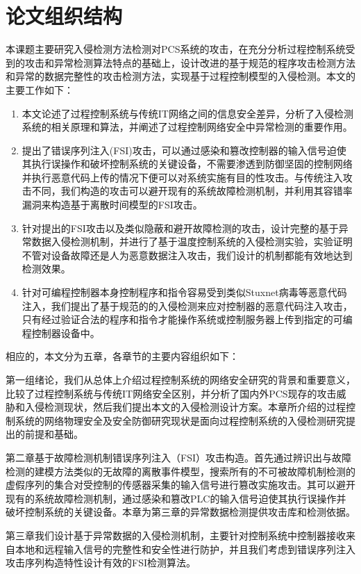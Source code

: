 \section{论文组织结构}

本课题主要研究入侵检测方法检测对PCS系统的攻击，在充分分析过程控制系统受到的攻击和异常检测算法特点的基础上，设计改进的基于规范的程序攻击检测方法和异常的数据完整性的攻击检测方法，实现基于过程控制模型的入侵检测。本文的主要工作如下：
\begin{enumerate}
	\item 本文论述了过程控制系统与传统IT网络之间的信息安全差异，分析了入侵检测系统的相关原理和算法，并阐述了过程控制网络安全中异常检测的重要作用。
	\item 提出了错误序列注入(FSI)攻击，可以通过感染和篡改控制器的输入信号迫使其执行误操作和破坏控制系统的关键设备，不需要渗透到防御坚固的控制网络并执行恶意代码上传的情况下便可以对系统实施有目的性攻击。与传统注入攻击不同，我们构造的攻击可以避开现有的系统故障检测机制，并利用其容错率漏洞来构造基于离散时间模型的FSI攻击。
	\item 针对提出的FSI攻击以及类似隐蔽和避开故障检测的攻击，设计完整的基于异常数据入侵检测机制，并进行了基于温度控制系统的入侵检测实验，实验证明不管对设备故障还是人为恶意数据注入攻击，我们设计的机制都能有效地达到检测效果。
	\item 针对可编程控制器本身控制程序和指令容易受到类似Stuxnet病毒等恶意代码注入，我们提出了基于规范的的入侵检测来应对控制器的恶意代码注入攻击，只有经过验证合法的程序和指令才能操作系统或控制服务器上传到指定的可编程控制器设备中。
\end{enumerate}

相应的，本文分为五章，各章节的主要内容组织如下：

第一组绪论，我们从总体上介绍过程控制系统的网络安全研究的背景和重要意义，比较了过程控制系统与传统IT网络安全区别，并分析了国内外PCS现存的攻击威胁和入侵检测现状，然后我们提出本文的入侵检测设计方案。本章所介绍的过程控制系统的网络物理安全及安全防御研究现状是面向过程控制系统的入侵检测研究提出的前提和基础。

第二章基于故障检测机制错误序列注入（FSI）攻击构造。首先通过辨识出与故障检测的建模方法类似的无故障的离散事件模型，搜索所有的不可被故障机制检测的虚假序列的集合对受控制的传感器采集的输入信号进行篡改实施攻击。其可以避开现有的系统故障检测机制，通过感染和篡改PLC的输入信号迫使其执行误操作并破坏控制系统的关键设备。本章为第三章的异常数据检测提供攻击库和检测依据。

第三章我们设计基于异常数据的入侵检测机制，主要针对控制系统中控制器接收来自本地和远程输入信号的完整性和安全性进行防护，并且我们考虑到错误序列注入攻击序列构造特性设计有效的FSI检测算法。

